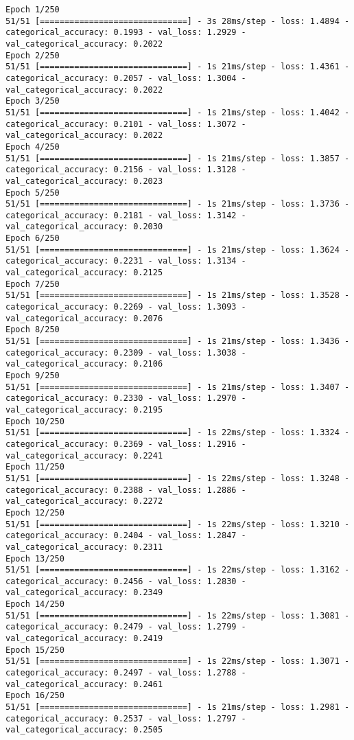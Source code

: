 \begin{lstlisting}
Epoch 1/250
51/51 [==============================] - 3s 28ms/step - loss: 1.4894 - categorical_accuracy: 0.1993 - val_loss: 1.2929 - val_categorical_accuracy: 0.2022
Epoch 2/250
51/51 [==============================] - 1s 21ms/step - loss: 1.4361 - categorical_accuracy: 0.2057 - val_loss: 1.3004 - val_categorical_accuracy: 0.2022
Epoch 3/250
51/51 [==============================] - 1s 21ms/step - loss: 1.4042 - categorical_accuracy: 0.2101 - val_loss: 1.3072 - val_categorical_accuracy: 0.2022
Epoch 4/250
51/51 [==============================] - 1s 21ms/step - loss: 1.3857 - categorical_accuracy: 0.2156 - val_loss: 1.3128 - val_categorical_accuracy: 0.2023
Epoch 5/250
51/51 [==============================] - 1s 21ms/step - loss: 1.3736 - categorical_accuracy: 0.2181 - val_loss: 1.3142 - val_categorical_accuracy: 0.2030
Epoch 6/250
51/51 [==============================] - 1s 21ms/step - loss: 1.3624 - categorical_accuracy: 0.2231 - val_loss: 1.3134 - val_categorical_accuracy: 0.2125
Epoch 7/250
51/51 [==============================] - 1s 21ms/step - loss: 1.3528 - categorical_accuracy: 0.2269 - val_loss: 1.3093 - val_categorical_accuracy: 0.2076
Epoch 8/250
51/51 [==============================] - 1s 21ms/step - loss: 1.3436 - categorical_accuracy: 0.2309 - val_loss: 1.3038 - val_categorical_accuracy: 0.2106
Epoch 9/250
51/51 [==============================] - 1s 21ms/step - loss: 1.3407 - categorical_accuracy: 0.2330 - val_loss: 1.2970 - val_categorical_accuracy: 0.2195
Epoch 10/250
51/51 [==============================] - 1s 22ms/step - loss: 1.3324 - categorical_accuracy: 0.2369 - val_loss: 1.2916 - val_categorical_accuracy: 0.2241
Epoch 11/250
51/51 [==============================] - 1s 22ms/step - loss: 1.3248 - categorical_accuracy: 0.2388 - val_loss: 1.2886 - val_categorical_accuracy: 0.2272
Epoch 12/250
51/51 [==============================] - 1s 22ms/step - loss: 1.3210 - categorical_accuracy: 0.2404 - val_loss: 1.2847 - val_categorical_accuracy: 0.2311
Epoch 13/250
51/51 [==============================] - 1s 22ms/step - loss: 1.3162 - categorical_accuracy: 0.2456 - val_loss: 1.2830 - val_categorical_accuracy: 0.2349
Epoch 14/250
51/51 [==============================] - 1s 22ms/step - loss: 1.3081 - categorical_accuracy: 0.2479 - val_loss: 1.2799 - val_categorical_accuracy: 0.2419
Epoch 15/250
51/51 [==============================] - 1s 22ms/step - loss: 1.3071 - categorical_accuracy: 0.2497 - val_loss: 1.2788 - val_categorical_accuracy: 0.2461
Epoch 16/250
51/51 [==============================] - 1s 21ms/step - loss: 1.2981 - categorical_accuracy: 0.2537 - val_loss: 1.2797 - val_categorical_accuracy: 0.2505

\end{lstlisting}
